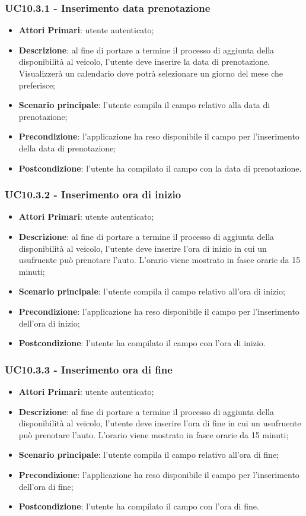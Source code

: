 \subsubsection{UC10.3.1 - Inserimento data prenotazione}
\begin{itemize}
	\item \textbf{Attori Primari}: utente autenticato;
	\item \textbf{Descrizione}: al fine di portare a termine il processo di aggiunta della disponibilità al veicolo, l'utente deve inserire la data di prenotazione. Visualizzerà un calendario dove potrà selezionare un giorno del mese che preferisce;
	\item \textbf{Scenario principale}: l'utente compila il campo relativo alla data di prenotazione;	
	\item \textbf{Precondizione}: l'applicazione ha reso disponibile il campo per l'inserimento della data di prenotazione;
	\item \textbf{Postcondizione}: l'utente ha compilato il campo con la data di prenotazione.	
\end{itemize}
\subsubsection{UC10.3.2 - Inserimento ora di inizio}
\begin{itemize}
	\item \textbf{Attori Primari}: utente autenticato;
	\item \textbf{Descrizione}: al fine di portare a termine il processo di aggiunta della disponibilità al veicolo, l'utente deve inserire l'ora di inizio in cui un usufruente può prenotare l'auto. L'orario viene mostrato in fasce orarie da 15 minuti;
	\item \textbf{Scenario principale}: l'utente compila il campo relativo all'ora di inizio;	
	\item \textbf{Precondizione}: l'applicazione ha reso disponibile il campo per l'inserimento dell'ora di inizio;
	\item \textbf{Postcondizione}: l'utente ha compilato il campo con l'ora di inizio.	
\end{itemize}
\subsubsection{UC10.3.3 - Inserimento ora di fine}
\begin{itemize}
	\item \textbf{Attori Primari}: utente autenticato;
	\item \textbf{Descrizione}: al fine di portare a termine il processo di aggiunta della disponibilità al veicolo, l'utente deve inserire l'ora di fine in cui un usufruente può prenotare l'auto. L'orario viene mostrato in fasce orarie da 15 minuti;
	\item \textbf{Scenario principale}: l'utente compila il campo relativo all'ora di fine;	
	\item \textbf{Precondizione}: l'applicazione ha reso disponibile il campo per l'inserimento dell'ora di fine;
	\item \textbf{Postcondizione}: l'utente ha compilato il campo con l'ora di fine.	
\end{itemize}
